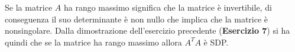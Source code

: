 \begin{flushleft}
Se la matrice $A$ ha rango massimo significa che la matrice è invertibile, di conseguenza il suo determinante è non nullo che implica che la matrice è nonsingolare. Dalla dimostrazione dell'esercizio precedente (\textbf{Esercizio 7}) si ha quindi che se la matrice ha rango massimo allora $A^TA$ è SDP.
\end{flushleft}